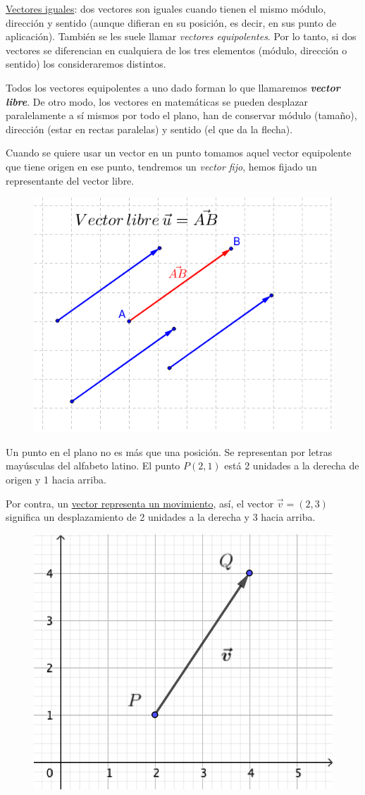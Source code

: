 \underline{Vectores iguales}: dos vectores son iguales cuando tienen el mismo módulo, dirección y sentido (aunque difieran en su posición, es decir, en sus punto de aplicación). También se les suele llamar \emph{vectores equipolentes}.
\textcolor{gris}{Por lo tanto, si dos vectores se diferencian en cualquiera de los tres elementos (módulo, dirección o sentido) los consideraremos distintos.}
\begin{multicols}{2}
Todos los vectores equipolentes a uno dado forman lo que llamaremos \textbf{\emph{vector libre}}. De otro modo, los vectores en matemáticas se pueden desplazar paralelamente a sí mismos por todo el plano, han de conservar módulo (tamaño), dirección (estar en rectas paralelas) y sentido (el que da la flecha).

Cuando se quiere usar un vector en un punto tomamos aquel vector equipolente que tiene origen en ese punto, tendremos un \emph{vector fijo}, hemos fijado un representante del vector libre.
\begin{figure}[H]
	\centering
	\includegraphics[width=.5\textwidth]{img-vec/vec02.png}	
\end{figure}

\end{multicols}
	
\begin{multicols}{2}
Un punto en el plano no es más que una posición. Se representan por letras mayúsculas del alfabeto latino. El punto $P(2,1)$ está 2 unidades a la derecha de origen y 1 hacia arriba.

Por contra, un 	\underline{vector representa un movimiento}, así, el vector $\vec v=(2,3)$ significa un desplazamiento de 2 unidades a la derecha y 3 hacia arriba.
\begin{figure}[H]
	\centering
	\includegraphics[width=.3\textwidth]{img-vec/vec03.png}	
\end{figure}	
\end{multicols}
	
